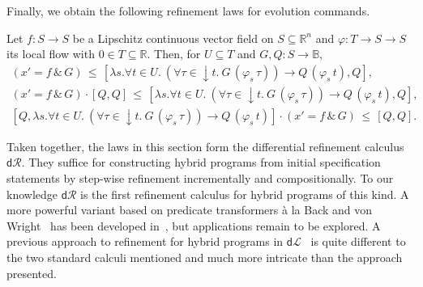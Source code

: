 \documentclass[envcountsame]{llncs}
\newcommand{\dL}{\mathsf{d}\mathcal{L}}
\newcommand{\dR}{\mathsf{d}\mathcal{R}}
\newcommand{\flow}{\varphi}
\newcommand{\reals}{\mathbb{R}}
\newcommand{\bools}{\mathbb{B}}
\begin{document}
Finally, we obtain the following refinement laws for evolution
commands.
\begin{lemma}\label{P:r-evl-lemma}
  Let $f:S\to S$ be a Lipschitz continuous vector field on
  $S\subseteq \reals^n$ and $\flow:T\to S\to S$ its local flow with
  $0\in T\subseteq \reals$. Then, for $U\subseteq T$ and
  $G,Q:S\to\bools$,
\begin{gather*}
(x' = f\, \&\, G)\, \le\, [\lambda s.\forall t\in U.\ (\forall
\tau\in {\downarrow}t.\ G\, (\flow_s\, \tau))\to Q\, (\flow_s\, t),Q],\label{eq:r-evl}\tag{r-evl}\\
(x' = f\, \&\, G) \cdot \left[Q,Q\right]\, \le\, [\lambda s. \forall t\in U.\ (\forall
\tau\in {\downarrow}t.\ G\, (\flow_s\, \tau))\to Q\, (\flow_s\, t),Q],\label{eq:r-evll}\tag{r-evll}\\
\left[Q,\lambda s. \forall t\in U.\ (\forall
\tau\in {\downarrow}t.\ G\, (\flow_s\, \tau))\to Q\, (\flow_s\,
t)\right]\cdot (x' = f\, \&\, G) \, \le \, [Q,Q].\label{eq:r-evlr}\tag{r-evlr}
\end{gather*}
\end{lemma}

Taken together, the laws in this section form the differential
refinement calculus $\dR$.  They suffice for constructing hybrid
programs from initial specification statements by step-wise refinement
incrementally and compositionally. To our knowledge $\dR$ is the first
refinement calculus for hybrid programs of this kind.  A more powerful
variant based on predicate transformers \`a la Back and von
Wright~\cite{BackW98} has been developed in~\cite{MuniveS19}, but
applications remain to be explored.  A previous approach to refinement
for hybrid programs in $\dL$~\cite{LoosP16} is quite different to the
two standard calculi mentioned and much more intricate than the
approach presented.
\end{document}

